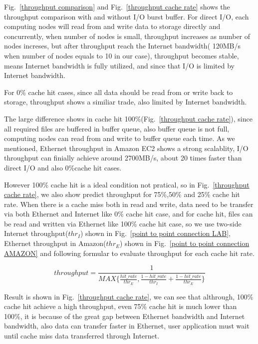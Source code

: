 Fig.~\ref{throughput comparison} and Fig.~\ref{throughput cache rate} shows the throughput comparison with and without I/O burst buffer.
For direct I/O, each computing nodes will read from and write data to storage directly and concurrently, when number of nodes is small, throughput increases as number of nodes increses, but after throughput reach the Internet bandwidth( 120MB/s when number of nodes equals to 10 in our case), throughput becomes stable, means Internet bandwidth is fully utilized, and since that I/O is limited by Internet bandwidth.

For 0\% cache hit cases, since all data should be read from or write back to storage, throughput shows a similiar trade, also limited by Internet bandwidth.

The large difference shows in cache hit 100\%(Fig.~\ref{throughput cache rate}), since all required files are buffered in buffer queue, also buffer queue is not full, computing nodes can read from and write to buffer queue each time.
As we mentioned, Ethernet throughput in Amazon EC2 shows a strong scalablity, I/O throughput can finially achieve around 2700MB/s, about 20 times faster than direct I/O and also 0\%cache hit cases.

However 100\% cache hit is a ideal condition not pratical, so in Fig.~\ref{throughput cache rate}, we also show predict throughput for 75\%,50\% and 25\% cache hit rate.
When there is a cache miss both in read and write, data need to be transfer via both Ethernet and Internet like 0\% cache hit case, and for cache hit, files can be read and written via Ethernet like 100\% cache hit case, so we use two-side Internet throughput($thr_I$) shown in Fig.~\ref{point to point connection LAB}, Ethernet throughput in Amazon($thr_E$) shown in Fig.~\ref{point to point connection AMAZON} and following formular to evaluate throughput for each cache hit rate.

\[throughput=\frac{1}{MAX\{\frac{{hit\_rate}}{thr_E},\frac{1-hit\_rate}{thr_I}+\frac{1-hit\_rate}{thr_E}\}}\]

Result is shown in Fig.~\ref{throughput cache rate}, we can see that althrough, 100\% cache hit achieve a high throughput, even 75\% cache hit is much lower than 100\%, it is because of the great gap between Ethernet bandwidth and Internet bandwidth, also data can transfer faster in Ethernet, user application must wait until cache miss data transferred through Internet.

